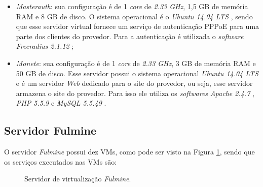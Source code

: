 \begin{itemize}
 \item \textit{Masterauth}: sua configuração é de 1 \textit{core} de \textit{2.33 GHz}, 1,5 GB de memória \ac{RAM} e 8 GB de disco. 
 O sistema operacional é o \textit{Ubuntu 14.04 \ac{LTS}} \cite{ubuntu}, sendo que esse servidor virtual fornece um serviço de autenticação 
 \ac{PPPoE} \cite{javvin2005} para uma parte dos clientes do provedor. Para a autenticação é utilizada o \textit{software} 
 \textit{Freeradius 2.1.12} \cite{freeradius};
 
 \item \textit{Monete}: sua configuração é de 1 \textit{core} de \textit{2.33 GHz}, 3 GB de memória \ac{RAM} e 50 GB de disco. 
 Esse servidor possui o sistema operacional \textit{Ubuntu 14.04 \ac{LTS}} \cite{ubuntu} e é um servidor \textit{Web} dedicado para o site do 
 provedor, ou seja, esse servidor armazena o site do provedor. Para isso ele utiliza os \textit{softwares} 
 \textit{Apache 2.4.7} \cite{apache}, \textit{\ac{PHP} 5.5.9} \cite{php} e \textit{MySQL 5.5.49} \cite{mysql}.
\end{itemize}

\subsection{Servidor Fulmine}
\label{section:serv_fulmine}

O servidor \textit{Fulmine} possui dez \ac{VM}s, como pode ser visto na Figura \ref{fig:servidor_fulmine}, sendo que os serviços executados nas 
\ac{VM}s são:

\begin{figure}[h!]
 \centering
 \caption{Servidor de virtualização \textit{Fulmine}.}
 \label{fig:servidor_fulmine}
\end{figure}

